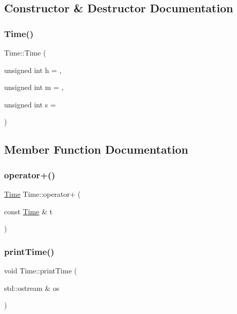 \subsection{Constructor \& Destructor Documentation}
\mbox{\label{classTime_a538120472036ef2387b72d9b00050898}} 
\subsubsection{\texorpdfstring{Time()}{Time()}}
{\footnotesize\ttfamily Time\+::\+Time (\begin{DoxyParamCaption}\item[{unsigned int}]{h = {},  }\item[{unsigned int}]{m = {},  }\item[{unsigned int}]{s = {} }\end{DoxyParamCaption})}



\subsection{Member Function Documentation}
\mbox{\label{classTime_affd07723baea79e855d58e12b42a5b8f}} 
\subsubsection{\texorpdfstring{operator+()}{operator+()}}
{\footnotesize\ttfamily \hyperlink{classTime}{Time} Time\+::operator+ (\begin{DoxyParamCaption}\item[{const \hyperlink{classTime}{Time} \&}]{t }\end{DoxyParamCaption})}

\mbox{\label{classTime_a79d96e150ff808580fdf43932897130d}} 
\subsubsection{\texorpdfstring{print\+Time()}{printTime()}}
{\footnotesize\ttfamily void Time\+::print\+Time (\begin{DoxyParamCaption}\item[{std\+::ostream \&}]{os }\end{DoxyParamCaption})}

